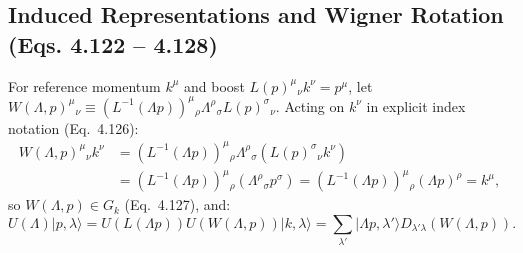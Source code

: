 \documentclass[11pt,a4paper]{article}
\begin{document}
\subsection{Induced Representations and Wigner Rotation (Eqs. 4.122 -- 4.128)}
For reference momentum $k^\mu$ and boost $L(p)^\mu{}_\nu k^\nu = p^\mu$, let $W(\Lambda, p)^\mu{}_\nu \equiv (L^{-1}(\Lambda p))^\mu{}_\rho \Lambda^\rho{}_\sigma L(p)^\sigma{}_\nu$. Acting on $k^\nu$ in explicit index notation (Eq.~4.126):
\begin{align}
    W(\Lambda, p)^\mu{}_\nu k^\nu &= (L^{-1}(\Lambda p))^\mu{}_\rho \Lambda^\rho{}_\sigma \left(L(p)^\sigma{}_\nu k^\nu\right) \nonumber \\
    &= (L^{-1}(\Lambda p))^\mu{}_\rho \left(\Lambda^\rho{}_\sigma p^\sigma\right) = (L^{-1}(\Lambda p))^\mu{}_\rho (\Lambda p)^\rho = k^\mu,
\end{align}
so $W(\Lambda, p) \in G_k$ (Eq.~4.127), and:
\begin{equation}
    U(\Lambda)|p,\lambda\rangle = U(L(\Lambda p))U(W(\Lambda,p))|k,\lambda\rangle = \sum_{\lambda'} |\Lambda p, \lambda'\rangle D_{\lambda'\lambda}(W(\Lambda,p)).
\end{equation}
\end{document}
